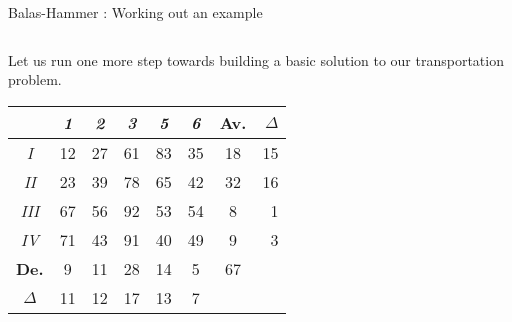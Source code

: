 \documentclass[32pt,aspectratio=169]{beamer}
\begin{document}
\begin{frame}{Balas-Hammer : Working out an example}
  \begin{columns}
    \begin{column}{.6\textwidth}
      \vfill
      
      Let us run one more step towards building a basic solution to
      our transportation problem.
      \vspace{1.3\baselineskip}

      \begin{overlayarea}{\textwidth}{.5\textheight}      
        \vspace{.22cm}
        \small{
          \begin{tabular}{c|c|c|c|c|c|c|r}
            & \textit{1} & \textit{2} & \cellcolor{orange}\textit{3} & \textit{5} & \textit{6} & \cellcolor{blue!50}\textbf{Av.} & \color{blue}$\Delta$ \\
            \hline
            \textit{I} & \cellcolor{orange}12 & \cellcolor{orange}27 & \cellcolor{orange}61 & \cellcolor{orange}83 & \cellcolor{orange}35 & \cellcolor{blue!50}18 & \color{blue}15 \\
            \hline 
            \textit{II} & \cellcolor{blue!25}23 & \cellcolor{blue!25}39 & \cellcolor{orange}78 &  \cellcolor{blue!25}65 & \cellcolor{blue!25}42 & \cellcolor{blue!50}32 & \color{blue}16\\
            \hline
            \textit{III} & \cellcolor{blue!25}67 & \cellcolor{blue!25}56 & \cellcolor{orange}92 & \cellcolor{blue!25}53 & \cellcolor{blue!25}54 & \cellcolor{blue!50}8 & \color{blue}1\\
            \hline
            \textit{IV} & \cellcolor{blue!25}71 & \cellcolor{blue!25}43 & \cellcolor{orange}91 & \cellcolor{blue!25}40 & \cellcolor{blue!25}49 & \cellcolor{blue!50}9 & \color{blue}3\\
            \hline 
            \cellcolor{blue!50}\textbf{De.} & \cellcolor{blue!50}9 & \cellcolor{blue!50}11 & \cellcolor{blue!50}28 & \cellcolor{blue!50}14 & \cellcolor{blue!50}5 & \cellcolor{blue!60}67  \\
            \cline{1-7}
            \color{blue}$\Delta$ & \color{blue}11 & \color{blue}12 & \cellcolor{orange}\color{blue}17 & \color{blue}13 & \color{blue}7
          \end{tabular}
        }

\end{overlayarea}
\end{column}
\end{columns}
\end{frame}
\end{document}
